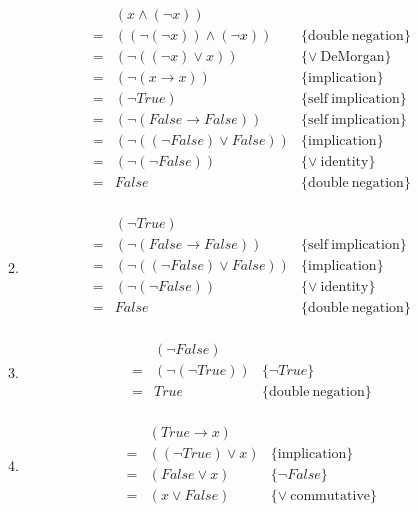 \documentclass{article}
\begin{document}
\begin{enumerate}
\begin{enumerate}
\[\begin{array}{lll}
              & (x \wedge (\neg x)) & \\
            = & ((\neg (\neg x)) \wedge (\neg x)) & \{\mathrm{double\ negation}\} \\
            = & (\neg ((\neg x) \vee x)) \ & \{\vee \mathrm{\ DeMorgan}\} \\
            = & (\neg (x \to x)) & \{\mathrm{implication}\} \\
            = & (\neg True) & \{\mathrm{self\ implication}\} \\
            = & (\neg (False \to False)) & \{\mathrm{self\ implication}\} \\
            = & (\neg ((\neg False) \vee False)) & \{\mathrm{implication}\} \\
            = & (\neg (\neg False)) & \{\vee \mathrm{\ identity}\} \\
            = & False & \{\mathrm{double\ negation}\} \\
          \end{array} \]
        \item
          \[ \begin{array}{lll}
              & (\neg True) & \\
            = & (\neg (False \to False)) & \{\mathrm{self\ implication}\} \\
            = & (\neg ((\neg False) \vee False)) & \{\mathrm{implication}\} \\
            = & (\neg (\neg False)) & \{\vee \mathrm{\ identity}\} \\
            = & False & \{\mathrm{double\ negation}\} \\
          \end{array} \]
        \item
          \[ \begin{array}{lll}
              & (\neg False) & \\
            = & (\neg (\neg True)) & \{\neg True\} \\
            = & True & \{\mathrm{double\ negation}\} \\
          \end{array} \]
        \item
          \[ \begin{array}{lll}
              & (True \to x) & \\
            = & ((\neg True) \vee x) & \{\mathrm{implication}\} \\
            = & (False \vee x) & \{\neg False\} \\
            = & (x \vee False) & \{\vee \mathrm{\ commutative}\} \\

\end{array}\]
\end{enumerate}
\end{enumerate}
\end{document}
